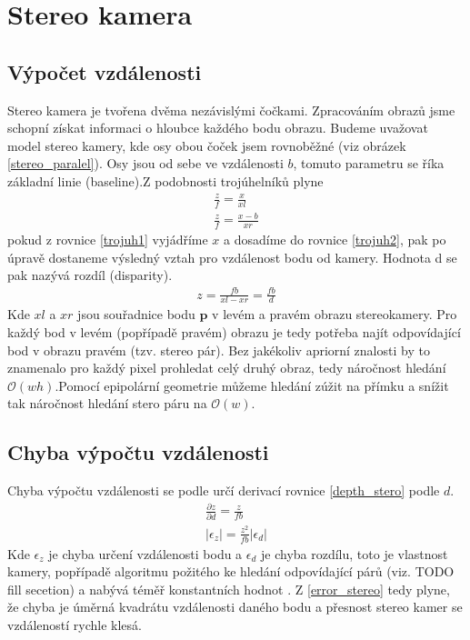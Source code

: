 \documentclass[twoside]{ctuthesis}
\newcommand{\tl}[1]{$\mathbf{#1}$}
\begin{document}
\section{Stereo kamera}
\subsection{Výpočet vzdálenosti}
Stereo kamera je tvořena dvěma nezávislými čočkami. Zpracováním obrazů jsme schopní získat informaci o hloubce každého bodu obrazu. Budeme uvažovat model stereo kamery, kde osy obou čoček jsem rovnoběžné (viz obrázek \ref{stereo_paralel}). Osy jsou od sebe ve vzdálenosti $b$, tomuto parametru se říka základní linie (baseline).Z podobnosti trojúhelníků plyne
\begin{align}
    \frac{z}{f} = \frac{x}{xl} \label{trojuh1} \\
    \frac{z}{f} = \frac{x - b}{xr} \label{trojuh2}
\end{align}
pokud z rovnice \ref{trojuh1} vyjádříme $x$ a dosadíme do rovnice \ref{trojuh2}, pak po úpravě dostaneme výsledný vztah pro vzdálenost bodu od kamery. Hodnota d se pak nazývá rozdíl (disparity).
\begin{align}
    z = \frac{fb}{xl - xr} = \frac{fb}{d} 
    \label{depth_stero}
\end{align}
Kde $xl$ a $xr$ jsou souřadnice bodu \tl{p} v levém a pravém obrazu stereokamery. Pro každý bod v levém (popřípadě pravém) obrazu je tedy potřeba najít odpovídající bod v obrazu pravém (tzv. stereo pár). Bez jakékoliv apriorní znalosti by to znamenalo pro každý pixel prohledat celý druhý obraz, tedy náročnost hledání $\mathcal{O}(wh)$.Pomocí epipolární geometrie můžeme hledání zúžit na přímku  a snížit tak náročnost hledání stero páru na $\mathcal{O}(w)$.

\subsection{Chyba výpočtu vzdálenosti}
Chyba výpočtu vzdálenosti se podle \cite{keselman2017intel} určí derivací rovnice \ref{depth_stero} podle $d$.
\begin{align}
    \frac{\partial z}{\partial d} = \frac{z}{fb} \\
    |\epsilon_z | = \frac{z^2}{fb}|\epsilon_d |
    \label{error_stereo}
\end{align}
Kde $\epsilon_z $ je chyba určení vzdálenosti bodu a $ \epsilon_d $ je chyba rozdílu, toto je vlastnost kamery, popřípadě algoritmu požitého ke hledání odpovídající párů (viz. TODO fill secetion) a nabývá téměř konstantních hodnot \cite{keselman2017intel}. Z \ref{error_stereo} tedy plyne, že chyba je úměrná kvadrátu vzdálenosti daného bodu a přesnost stereo kamer se vzdáleností rychle klesá.
\end{document}
